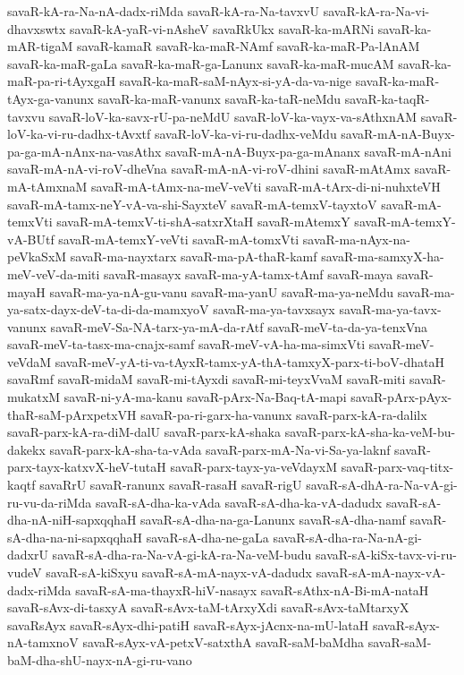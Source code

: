 {savaR-kA-ra-Na-nA-dadx-riMda
savaR-kA-ra-Na-tavxvU
savaR-kA-ra-Na-vi-dhavxswtx
savaR-kA-yaR-vi-nAsheV
savaRkUkx
savaR-ka-mARNi
savaR-ka-mAR-tigaM
savaR-kamaR
savaR-ka-maR-NAmf
savaR-ka-maR-Pa-lAnAM
savaR-ka-maR-gaLa
savaR-ka-maR-ga-Lanunx
savaR-ka-maR-mucAM
savaR-ka-maR-pa-ri-tAyxgaH
savaR-ka-maR-saM-nAyx-si-yA-da-va-nige
savaR-ka-maR-tAyx-ga-vanunx
savaR-ka-maR-vanunx
savaR-ka-taR-neMdu
savaR-ka-taqR-tavxvu
savaR-loV-ka-savx-rU-pa-neMdU
savaR-loV-ka-vayx-va-sAthxnAM
savaR-loV-ka-vi-ru-dadhx-tAvxtf
savaR-loV-ka-vi-ru-dadhx-veMdu
savaR-mA-nA-Buyx-pa-ga-mA-nAnx-na-vasAthx
savaR-mA-nA-Buyx-pa-ga-mAnanx
savaR-mA-nAni
savaR-mA-nA-vi-roV-dheVna
savaR-mA-nA-vi-roV-dhini
savaR-mAtAmx
savaR-mA-tAmxnaM
savaR-mA-tAmx-na-meV-veVti
savaR-mA-tArx-di-ni-nuhxteVH
savaR-mA-tamx-neY-vA-va-shi-SayxteV
savaR-mA-temxV-tayxtoV
savaR-mA-temxVti
savaR-mA-temxV-ti-shA-satxrXtaH
savaR-mAtemxY
savaR-mA-temxY-vA-BUtf
savaR-mA-temxY-veVti
savaR-mA-tomxVti
savaR-ma-nAyx-na-peVkaSxM
savaR-ma-nayxtarx
savaR-ma-pA-thaR-kamf
savaR-ma-samxyX-ha-meV-veV-da-miti
savaR-masayx
savaR-ma-yA-tamx-tAmf
savaR-maya
savaR-mayaH
savaR-ma-ya-nA-gu-vanu
savaR-ma-yanU
savaR-ma-ya-neMdu
savaR-ma-ya-satx-dayx-deV-ta-di-da-mamxyoV
savaR-ma-ya-tavxsayx
savaR-ma-ya-tavx-vanunx
savaR-meV-Sa-NA-tarx-ya-mA-da-rAtf
savaR-meV-ta-da-ya-tenxVna
savaR-meV-ta-tasx-ma-cnajx-samf
savaR-meV-vA-ha-ma-simxVti
savaR-meV-veVdaM
savaR-meV-yA-ti-va-tAyxR-tamx-yA-thA-tamxyX-parx-ti-boV-dhataH
savaRmf
savaR-midaM
savaR-mi-tAyxdi
savaR-mi-teyxVvaM
savaR-miti
savaR-mukatxM
savaR-ni-yA-ma-kanu
savaR-pArx-Na-Baq-tA-mapi
savaR-pArx-pAyx-thaR-saM-pArxpetxVH
savaR-pa-ri-garx-ha-vanunx
savaR-parx-kA-ra-dalilx
savaR-parx-kA-ra-diM-dalU
savaR-parx-kA-shaka
savaR-parx-kA-sha-ka-veM-bu-dakekx
savaR-parx-kA-sha-ta-vAda
savaR-parx-mA-Na-vi-Sa-ya-laknf
savaR-parx-tayx-katxvX-heV-tutaH
savaR-parx-tayx-ya-veVdayxM
savaR-parx-vaq-titx-kaqtf
savaRrU
savaR-ranunx
savaR-rasaH
savaR-rigU
savaR-sA-dhA-ra-Na-vA-gi-ru-vu-da-riMda
savaR-sA-dha-ka-vAda
savaR-sA-dha-ka-vA-dadudx
savaR-sA-dha-nA-niH-sapxqqhaH
savaR-sA-dha-na-ga-Lanunx
savaR-sA-dha-namf
savaR-sA-dha-na-ni-sapxqqhaH
savaR-sA-dha-ne-gaLa
savaR-sA-dha-ra-Na-nA-gi-dadxrU
savaR-sA-dha-ra-Na-vA-gi-kA-ra-Na-veM-budu
savaR-sA-kiSx-tavx-vi-ru-vudeV
savaR-sA-kiSxyu
savaR-sA-mA-nayx-vA-dadudx
savaR-sA-mA-nayx-vA-dadx-riMda
savaR-sA-ma-thayxR-hiV-nasayx
savaR-sAthx-nA-Bi-mA-nataH
savaR-sAvx-di-tasxyA
savaR-sAvx-taM-tArxyXdi
savaR-sAvx-taMtarxyX
savaRsAyx
savaR-sAyx-dhi-patiH
savaR-sAyx-jAcnx-na-mU-lataH
savaR-sAyx-nA-tamxnoV
savaR-sAyx-vA-petxV-satxthA
savaR-saM-baMdha
savaR-saM-baM-dha-shU-nayx-nA-gi-ru-vano
}
